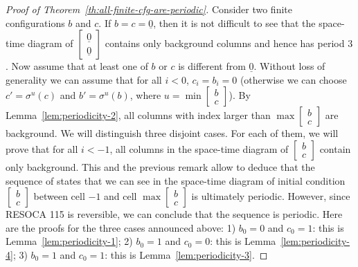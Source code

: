 \documentclass[10pt,a4paper]{amsart}
\newcommand{\cvres}[2]{\ensuremath{\begin{bmatrix}#1\\#2\end{bmatrix}}\xspace}
\newcommand{\cz}{\ensuremath{\underline{0}}\xspace}
\begin{document}
\begin{proof}[Proof of Theorem~\ref{th:all-finite-cfg-are-periodic}]
Consider two finite configurations $b$ and $c$. If $b=c=\cz$, then it is not difficult to see that the space-time diagram of \cvres{\cz}{\cz} contains only background columns and hence has period $3$. Now assume that at least one
of $b$ or $c$ is different from \cz.
Without loss of generality we can assume that for all $i<0$, $c_i=b_i=0$
(otherwise we can choose $c'=\sigma^u(c)$ and $b'=\sigma^u(b)$, where $u=\min \cvres{b}{c}$).
By Lemma~\ref{lem:periodicity-2}, all
columns with index larger than $\max \cvres{b}{c}$ are background.
We will distinguish three disjoint cases. For each of them, we will prove
that for all $i<-1$, all columns in the space-time diagram of \cvres{b}{c} contain only background. This and the previous remark allow to deduce that
the sequence of states that we can see in the space-time diagram of initial condition \cvres{b}{c} between cell $-1$ and cell $\max\cvres{b}{c}$ is ultimately periodic. However, since RESOCA 115
is reversible, we can conclude that the sequence is periodic. Here are the
proofs for the three cases announced above:
1) $b_0=0$ and $c_0=1$: this is Lemma~\ref{lem:periodicity-1};
2) $b_0=1$ and $c_0=0$: this is Lemma~\ref{lem:periodicity-4};
3) $b_0=1$ and $c_0=1$:
    this is Lemma~\ref{lem:periodicity-3}.
\end{proof}
\end{document}
